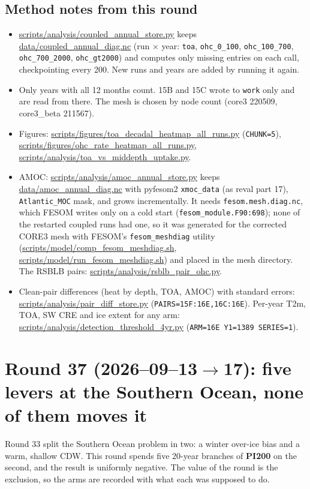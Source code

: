 \documentclass[10pt]{article}
\begin{document}
\subsection{Method notes from this round}\label{sub:r36method}
\begin{itemize}\itemsep2pt
\item \url{scripts/analysis/coupled_annual_store.py} keeps \url{data/coupled_annual_diag.nc}
(run $\times$ year: \texttt{toa}, \texttt{ohc\_0\_100}, \texttt{ohc\_100\_700},
\texttt{ohc\_700\_2000}, \texttt{ohc\_gt2000}) and computes only missing entries on each call,
checkpointing every 200. New runs and years are added by running it again.
\item Only years with all 12 months count. 15B and 15C wrote to \texttt{work} only and are read
from there. The mesh is chosen by node count (core3 220509, core3\_beta 211567).
\item Figures: \url{scripts/figures/toa_decadal_heatmap_all_runs.py} (\texttt{CHUNK=5}),
\url{scripts/figures/ohc_rate_heatmap_all_runs.py},
\url{scripts/analysis/toa_vs_middepth_uptake.py}.
\item AMOC: \url{scripts/analysis/amoc_annual_store.py} keeps \url{data/amoc_annual_diag.nc}
with pyfesom2 \texttt{xmoc\_data} (as reval part 17), \texttt{Atlantic\_MOC} mask, and grows
incrementally. It needs \texttt{fesom.mesh.diag.nc}, which FESOM writes only on a cold start
(\texttt{fesom\_module.F90:698}); none of the restarted coupled runs had one, so it was
generated for the corrected CORE3 mesh with FESOM's \texttt{fesom\_meshdiag} utility
(\url{scripts/model/comp_fesom_meshdiag.sh}, \url{scripts/model/run_fesom_meshdiag.sh}) and
placed in the mesh directory. The RSBLB pairs: \url{scripts/analysis/rsblb_pair_ohc.py}.
\item Clean-pair differences (heat by depth, TOA, AMOC) with standard errors:
\url{scripts/analysis/pair_diff_store.py} (\texttt{PAIRS=15F:16E,16C:16E}). Per-year T2m, TOA,
SW CRE and ice extent for any arm: \url{scripts/analysis/detection_threshold_4yr.py}
(\texttt{ARM=16E Y1=1389 SERIES=1}).
\end{itemize}

\section{Round 37 (2026--09--13$\to$17): five levers at the Southern Ocean, none of them moves it}\label{sec:round37}

Round 33 split the Southern Ocean problem in two: a winter over-ice bias and a warm, shallow
CDW. This round spends five 20-year branches of \textbf{PI200} on the second, and the result is
uniformly negative. The value of the round is the exclusion, so the arms are recorded with what
each was supposed to do.
\end{document}
